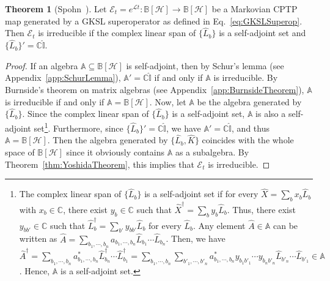 \documentclass[preprint,pteplogo]{ptephy_v2}%
\numberwithin{equation}{section}
\theoremstyle{definition}
\newtheorem{theorem}{Theorem}
\newcommand{\mc}[1]{\mathcal{#1}}
\newcommand{\mbb}[1]{\mathbb{#1}}
\begin{document}
\begin{theorem}[Spohn~\cite{spohn1977algebraic}]
\label{thm:SpohnTheorem}
Let $\mc{E}_t = e^{\mc{L}t} : \mbb{B}[\mc{H}] \to \mbb{B}[\mc{H}]$ be a Markovian CPTP map generated by a GKSL superoperator as defined in Eq.~\eqref{eq:GKSLSuperop}. 
Then $\mc{E}_t$ is irreducible if the complex linear span of $\{ \hat{L}_b \}$ is a self-adjoint set and $\{ \hat{L}_b \}' = \mbb{C} \hat{\mbb{I}}$. 
\end{theorem}

\begin{proof}
If an algebra $\mbb{A} \subseteq \mbb{B}[\mc{H}]$ is self-adjoint, then by Schur's lemma (see Appendix~\ref{app:SchurLemma}), $\mbb{A}' = \mbb{C} \hat{\mbb{I}}$ if and only if $\mbb{A}$ is irreducible.
By Burnside's theorem on matrix algebras (see Appendix~\ref{app:BurnsideTheorem}), $\mbb{A}$ is irreducible if and only if $\mbb{A} = \mbb{B}[\mc{H}]$.
Now, let $\mbb{A}$ be the algebra generated by $\{ \hat{L}_b \}$.
Since the complex linear span of $\{ \hat{L}_b \}$ is a self-adjoint set, $\mbb{A}$ is also a self-adjoint set\footnote{
The complex linear span of $\{ \hat{L}_b \}$ is a self-adjoint set if for every $\hat{X} = \sum_b x_b \hat{L}_b$ with $x_b \in \mbb{C}$, there exist $y_b \in \mbb{C}$ such that $\hat{X}^\dagger = \sum_b y_b \hat{L}_b$.
Thus, there exist $y_{bb'} \in \mbb{C}$ such that $\hat{L}_b^\dagger = \sum_{b'} y_{bb'} \hat{L}_b$ for every $\hat{L}_b$.
Any element $\hat{A} \in \mbb{A}$ can be written as $\hat{A} = \sum_{b_1,\cdots,b_n} a_{b_1,\cdots,b_n} \hat{L}_{b_1} \cdots \hat{L}_{b_n}$.
Then, we have $\hat{A}^\dagger = \sum_{b_1,\cdots,b_n} a_{b_1,\cdots,b_n}^* \hat{L}_{b_n}^\dagger \cdots \hat{L}_{b_1}^\dagger = \sum_{b_1,\cdots,b_n} \sum_{b'_1,\cdots,b'_n} a_{b_1,\cdots,b_n}^* y_{b_1 b'_1} \cdots y_{b_n b'_n} \hat{L}_{b'_n} \cdots \hat{L}_{b'_1} \in \mbb{A}$.
Hence, $\mbb{A}$ is a self-adjoint set.
}.
Furthermore, since $\{ \hat{L}_b \}' = \mbb{C} \hat{\mbb{I}}$, we have $\mbb{A}' = \mbb{C} \hat{\mbb{I}}$, and thus $\mbb{A} = \mbb{B}[\mc{H}]$. 
Then the algebra generated by $\{ \hat{L}_b, \hat{K} \}$ coincides with the whole space of $\mbb{B}[\mc{H}]$ since it obviously contains $\mbb{A}$ as a subalgebra.
By Theorem~\ref{thm:YoshidaTheorem}, this implies that $\mc{E}_t$ is irreducible.
\end{proof}
\end{document}
